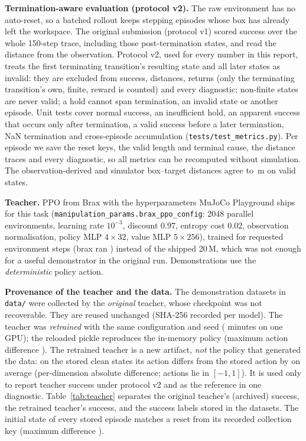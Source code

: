 \documentclass[11pt]{article}
\begin{document}
\textbf{Termination-aware evaluation (protocol v2).} The raw environment has no
auto-reset, so a batched rollout keeps stepping episodes whose box has already
left the workspace. The original submission (protocol v1) scored success over
the whole 150-step trace, including those post-termination states, and read the
distance from the observation. Protocol v2, used for every number in this
report, treats the first terminating transition's resulting state and all later
states as invalid: they are excluded from success, distances, returns (only the
terminating transition's own, finite, reward is counted) and every diagnostic;
non-finite states are never valid; a hold cannot span termination, an invalid
state or another episode. Unit tests cover normal success, an insufficient hold,
an apparent success that occurs only after termination, a valid success before a
later termination, NaN termination and cross-episode accumulation
(\texttt{tests/test\_metrics.py}). Per episode we save the reset keys, the valid
length and terminal cause, the distance traces and every diagnostic, so all
metrics can be recomputed without simulation. The observation-derived and
simulator box--target distances agree to \obsSimDev\,m on valid states.

\textbf{Teacher.} PPO from Brax with the hyperparameters MuJoCo Playground ships
for this task (\texttt{manipulation\_params.brax\_ppo\_config}: 2048 parallel
environments, learning rate $10^{-3}$, discount $0.97$, entropy cost $0.02$,
observation normalisation, policy MLP $4\times32$, value MLP $5\times256$),
trained for \teacherSteps{} requested environment steps (brax ran
\teacherStepsReached) instead of the shipped 20\,M, which was not enough for a
useful demonstrator in the original run. Demonstrations use the
\emph{deterministic} policy action.

\textbf{Provenance of the teacher and the data.} The demonstration datasets in
\texttt{data/} were collected by the \emph{original} teacher, whose checkpoint was
not recoverable. They are reused unchanged (SHA-256 recorded per model). The
teacher was \emph{retrained} with the same configuration and seed
(\teacherWallMin{} minutes on one GPU); the reloaded pickle reproduces the
in-memory policy (maximum action difference \teacherReloadDev). The retrained teacher is a new artifact,
\emph{not} the policy that generated the data: on the stored clean states its
action differs from the stored action by \dataResidClean{} on average
(per-dimension absolute difference; actions lie in $[-1,1]$). It is used only to
report teacher success under protocol v2 and as the reference in one diagnostic.
Table~\ref{tab:teacher} separates the original teacher's (archived) success, the
retrained teacher's success, and the success labels stored in the datasets. The
initial state of every stored episode matches a reset from its recorded
collection key (maximum difference \dataResetDev).
\end{document}

